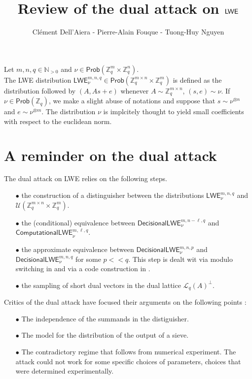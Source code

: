 \documentclass{article}
\title{Review of the dual attack on $\LWE$}
\author{Clément Dell'Aiera - Pierre-Alain Fouque - Tuong-Huy Nguyen}
\newcommand{\NN}{\mathbb{N}}
\newcommand{\ZZ}{\mathbb{Z}}
\newcommand{\Prob}{\mathsf{Prob}}
\newcommand{\LL}{\mathcal{L}}
\newcommand{\U}{\mathcal{U}}
\newcommand{\LWE}{\mathsf{LWE}}
\newcommand{\dLWE}{\mathsf{DecisionalLWE}}
\newcommand{\cLWE}{\mathsf{ComputationalLWE}}
\begin{document}
\maketitle

Let $m,n,q\in\NN_{>0}$ and $\nu\in \Prob (\ZZ_q^m \times \ZZ_q^n )$.\\

The LWE distribution $\LWE^{m,n,q}_\nu \in \Prob(\ZZ_q^{m\times n} \times \ZZ_q^{m})$ is defined as the distribution followed by $(A,As+ e )$ whenever $A\sim \ZZ_q^{m\times n }$, $(s,e)\sim \nu$. If $\nu\in\Prob(\ZZ_q)$, we make a slight abuse of notations and suppose that $s\sim \nu^{\otimes n}$ and $e\sim \nu^{\otimes m}$. The distribution $\nu$ is implcitely thought to yield small coefficients with respect to the euclidean norm.

\section{A reminder on the dual attack}

The dual attack on LWE relies on the following steps.
\begin{itemize}
	\item[$\bullet$] the construction of a distinguisher between the distributions $\LWE^{m,n,q}_\nu$ and $\U(\ZZ_q^{m\times n} \times \ZZ_q^{m})$.
	\item[$\bullet$] the (conditional) equivalence between $\dLWE^{m,n - \ell,q}_\nu$ and $\cLWE_\nu^{m,\ell,q}$. 
	\item[$\bullet$] the approximate equivalence between $\dLWE^{m,n,p}_\nu$ and $\dLWE^{m,n,q}_\nu$ for some $p<<q$. This step is dealt wit via modulo switching in \cite{Matzov} and via a code construction in \cite{carrier2024reduction}.
	\item[$\bullet$] the sampling of short dual vectors in the dual lattice $\LL_q(A)^\perp$.
\end{itemize}

Critics of the dual attack have focused their arguments on the following points :
\begin{itemize}
\item[$\bullet$] The independence of the summands in the distiguisher.
\item[$\bullet$] The model for the distribution of the output of a sieve.
\item[$\bullet$] The contradictory regime that follows from numerical experiment. The attack could not work for some specific choices of parameters, choices that were determined experimentally.
\end{itemize}
\end{document}
